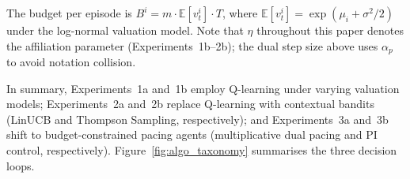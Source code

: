 The budget per episode is $B^i = m \cdot \mathbb{E}[v_t^i] \cdot T$, where $\mathbb{E}[v_t^i] = \exp(\mu_i + \sigma^2/2)$ under the log-normal valuation model. Note that $\eta$ throughout this paper denotes the affiliation parameter (Experiments~1b--2b); the dual step size above uses $\alpha_p$ to avoid notation collision.

\label{sec:appendix_algorithms}

In summary, Experiments~1a and~1b employ Q-learning under varying valuation models; Experiments~2a and~2b replace Q-learning with contextual bandits (LinUCB and Thompson Sampling, respectively); and Experiments~3a and~3b shift to budget-constrained pacing agents (multiplicative dual pacing and PI control, respectively). Figure~\ref{fig:algo_taxonomy} summarises the three decision loops.

